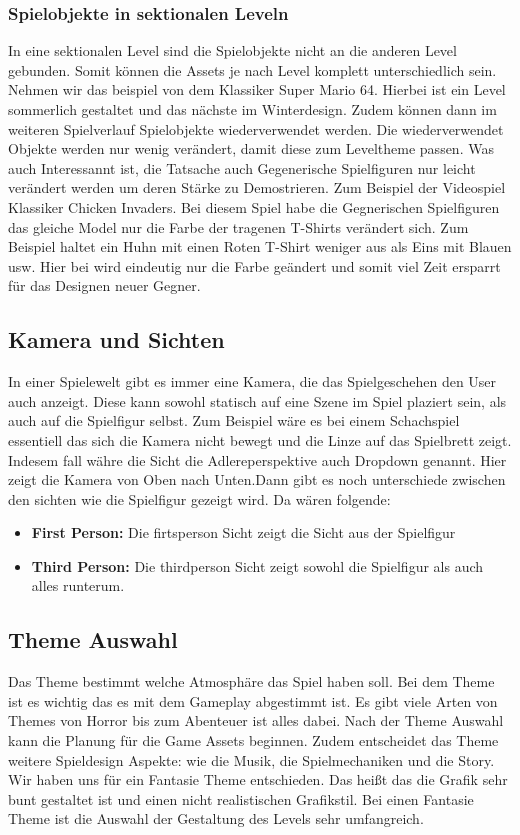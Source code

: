 \subsubsection{Spielobjekte in sektionalen Leveln}
In eine sektionalen Level sind die Spielobjekte nicht an die anderen Level gebunden. Somit können die Assets je nach Level komplett unterschiedlich sein. Nehmen wir das beispiel von dem Klassiker Super Mario 64. Hierbei ist ein Level sommerlich gestaltet und das nächste im Winterdesign. Zudem können dann im weiteren Spielverlauf Spielobjekte wiederverwendet werden. Die wiederverwendet Objekte werden nur wenig verändert, damit diese zum Leveltheme passen. Was auch Interessannt ist, die Tatsache auch Gegenerische Spielfiguren nur leicht verändert werden um deren Stärke zu Demostrieren. Zum Beispiel der Videospiel Klassiker Chicken Invaders. Bei diesem Spiel habe die Gegnerischen Spielfiguren das gleiche Model nur die Farbe der tragenen T-Shirts verändert sich. Zum Beispiel haltet ein Huhn mit einen Roten T-Shirt weniger aus als Eins mit Blauen usw. Hier bei wird eindeutig nur die Farbe geändert und somit viel Zeit ersparrt für das Designen neuer Gegner.

\subsection{Kamera und Sichten}
In einer Spielewelt gibt es immer eine Kamera, die das Spielgeschehen den User auch anzeigt. Diese kann sowohl statisch auf eine Szene im Spiel plaziert sein, als auch auf die Spielfigur selbst. Zum Beispiel wäre es bei einem Schachspiel essentiell das sich die Kamera nicht bewegt und die Linze auf das Spielbrett zeigt. Indesem fall währe die Sicht die Adlereperspektive auch Dropdown genannt. Hier zeigt die Kamera von Oben nach Unten.Dann gibt es noch unterschiede zwischen den sichten wie die Spielfigur gezeigt wird. Da wären folgende:

\begin{itemize}
    \item \textbf{First Person:}
    \noindent Die firtsperson Sicht zeigt die Sicht aus der Spielfigur
    \item \textbf{Third Person:}
    \noindent Die thirdperson Sicht zeigt sowohl die Spielfigur als auch alles runterum. 
\end{itemize}

\subsection{Theme Auswahl}
Das Theme bestimmt welche Atmosphäre das Spiel haben soll. Bei dem Theme ist es wichtig das es mit dem Gameplay abgestimmt ist. Es gibt viele Arten von Themes von Horror bis zum Abenteuer ist alles dabei. Nach der Theme Auswahl kann die Planung für die  Game Assets beginnen. Zudem entscheidet das Theme weitere Spieldesign Aspekte: wie die Musik, die Spielmechaniken und die  Story. Wir haben uns für ein Fantasie Theme entschieden. Das heißt das die Grafik sehr bunt gestaltet ist und einen nicht realistischen Grafikstil. Bei einen Fantasie Theme ist die Auswahl der Gestaltung des Levels sehr umfangreich. 


